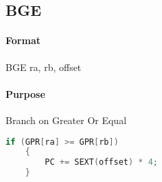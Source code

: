 \subsection{BGE}


\paragraph{Format} BGE ra, rb, offset

\paragraph{Purpose} Branch on Greater Or Equal

\begin{lstlisting}[language=c]
    if (GPR[ra] >= GPR[rb])
    {
        PC += SEXT(offset) * 4;
    }
\end{lstlisting}
